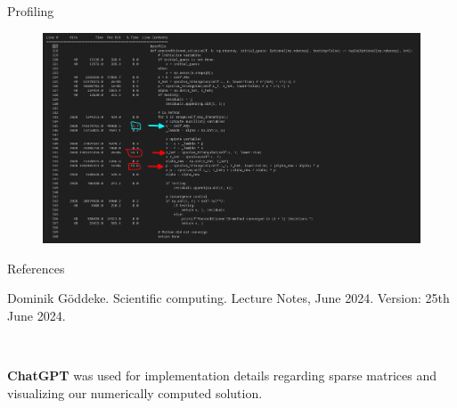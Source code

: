 \documentclass[11pt,aspectratio=1610]{beamer}
\begin{document}
\begin{frame}{Profiling}
\begin{figure}
    \includegraphics[width=\textwidth]{../images/line_profiler.png}
\end{figure}

\end{frame}





\begin{frame}{References}

%
%

\begin{thebibliography}{1}

Dominik Göddeke.
\newblock Scientific computing.
\newblock Lecture Notes, June 2024.
\newblock Version: 25th June 2024.

\end{thebibliography}


\vspace{10mm} 

\textbf{ChatGPT} was used for implementation details regarding sparse matrices and visualizing our numerically computed solution. 


\end{frame}







%
%
\end{document}
